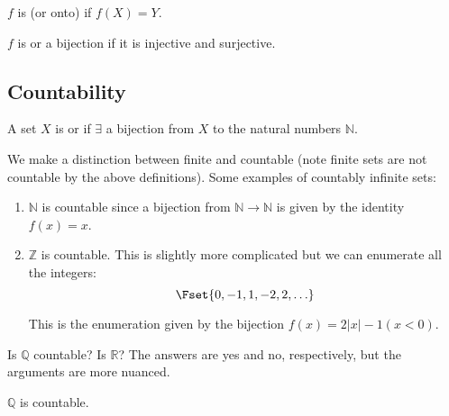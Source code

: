 \documentclass{article}
\begin{document}
\begin{definition}[surjective]\label{def:lecture1_surjective}
  $f$ is  (or onto) if $f(X) = Y$.
\end{definition}

\begin{definition}[bijective]\label{def:lecture1_bijective}
  $f$ is  or a bijection if it is injective and surjective.
\end{definition}

\subsection{Countability}
\label{sub:countability}

\begin{definition}[countability]\label{def:lecture1_countable}
  A set $X$ is  or  if $\exists$ a bijection from $X$ to the natural numbers $\mathbb{N}$.
\end{definition}

We make a distinction between finite and countable (note finite sets are not countable by the above definitions). Some examples of countably infinite sets:
\begin{enumerate}
  \item $\mathbb{N}$ is countable since a bijection from $\mathbb{N} \to \mathbb{N}$ is given by the identity $f(x) = x$.

  \item $\mathbb{Z}$ is countable. This is slightly more complicated but we can enumerate all the integers:
    \[
      \Fset{0, -1, 1, -2, 2, \ldots}
    \]

    This is the enumeration given by the bijection $f(x) = 2|x| - 1(x < 0)$.
\end{enumerate}

Is $\mathbb{Q}$ countable? Is $\mathbb{R}$? The answers are yes and no, respectively, but the arguments are more nuanced.
\begin{claim}
  $\mathbb{Q}$ is countable.
\end{claim}
\end{document}
